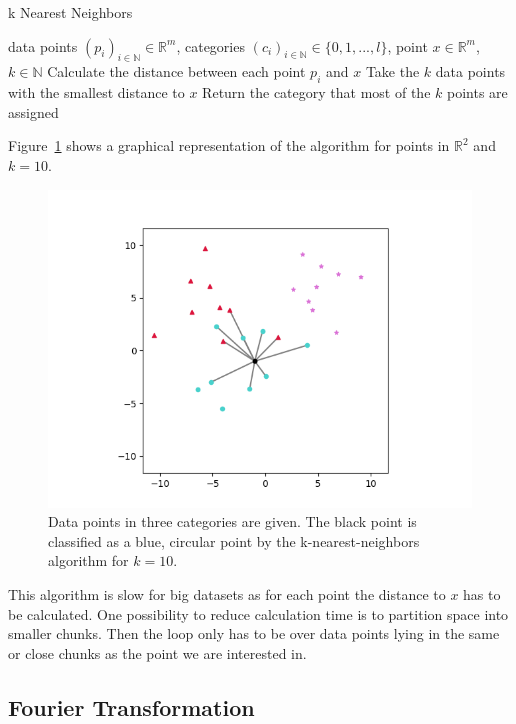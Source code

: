 \documentclass[a4paper]{IEEEtran}
\begin{document}
\begin{algorithm}
	\caption{k Nearest Neighbors}\label{alg:k_nearest_neighbors}
	\begin{algorithmic}
		\Require data points $(p_i)_{i \in \mathbb{N}} \in \mathbb{R}^{m}$, categories $(c_i)_{i \in \mathbb{N}} \in \{0, 1, ..., l\}$, point $x \in \mathbb{R}^{m}$, $k \in \mathbb{N}$
		\State Calculate the distance between each point $p_i$ and $x$
		\State Take the $k$ data points with the smallest distance to $x$
		\State Return the category that most of the $k$ points are assigned
	\end{algorithmic}
\end{algorithm}

Figure~\ref{fig:k_nearest_neighbors} shows a graphical representation of the algorithm for points in $\mathbb{R}^2$ and $k=10$.

\begin{figure}
	\centering
	\includegraphics[width=\linewidth]{figs/k_nearest_neighbors}
	\caption{Data points in three categories are given. The black point is classified as a blue, circular point by the k-nearest-neighbors algorithm for $k=10$.}
	\label{fig:k_nearest_neighbors}
\end{figure}

This algorithm is slow for big datasets as for each point the distance to $x$ has to be calculated. One possibility to reduce calculation time is to partition space into smaller chunks. Then the loop only has to be over data points lying in the same or close chunks as the point we are interested in.

\subsection{Fourier Transformation}
\label{subsec:fourier_transformation}
\end{document}
